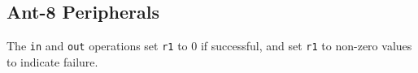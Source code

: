 \subsection{{\sc Ant-8} Peripherals}
\label{peripheral-sec}

The {\tt in} and {\tt out} operations set {\tt r1} to 0 if successful,
and set {\tt r1} to non-zero values to indicate failure. 

\vspace{3mm}


